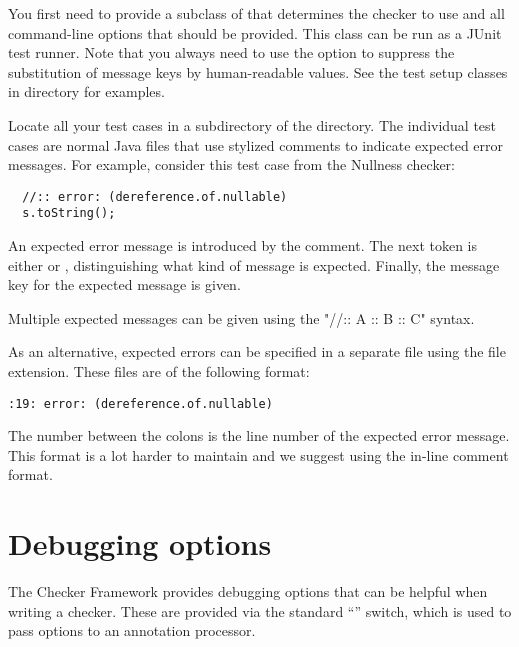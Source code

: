 You first need to provide a subclass of
that determines the checker to use and all command-line options that
should be provided.
This class can be run as a JUnit test runner.
Note that you always need to use the
 option to suppress the substitution of message keys
by human-readable values.
See the test setup classes in directory  for examples.

Locate all your test cases in a subdirectory of the 
directory.
The individual test cases are normal Java files that use stylized
comments to indicate expected error messages.
For example, consider this test case from the Nullness checker:

\begin{Verbatim}
  //:: error: (dereference.of.nullable)
  s.toString();
\end{Verbatim}

An expected error message is introduced by the \code{//::} comment.
The next token is either  or ,
distinguishing what kind of message is expected.
Finally, the message key for the expected message is given.

Multiple expected messages can be given using the "//:: A :: B :: C"
syntax.

As an alternative, expected errors can be specified in a separate file
using the  file extension.
These files are of the following format:

\begin{Verbatim}
:19: error: (dereference.of.nullable)
\end{Verbatim}

The number between the colons is the line number of the expected error
message.
This format is a lot harder to maintain and we suggest using the
in-line comment format.



\section{Debugging options\label{debugging-options}}

The Checker Framework provides debugging options that can be helpful when
writing a checker. These are provided via the standard  ``''
switch, which is used to pass options to an annotation processor.

